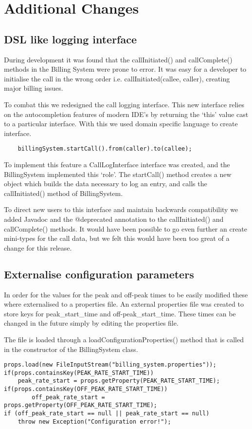 \section{Additional Changes}

\subsection{DSL like logging interface}
During development it was found that the callInitiated() and callComplete() methods in the Billing System were prone to error. It was easy for a developer to initialise the call in the wrong order i.e. callInitiated(callee, caller), creating major billing issues.

To combat this we redesigned the call logging interface. This new interface relies on the autocompletion features of modern IDE’s by returning the ‘this’ value cast to a particular interface. With this we used domain specific language to create interface.
\begin{lstlisting}
	billingSystem.startCall().from(caller).to(callee);
\end{lstlisting}
To implement this feature a CallLogInterface interface was created, and the BillingSystem implemented this ‘role’. The startCall() method creates a new object which builds the data necessary to log an entry, and calls the callInitiated() method of BillingSystem.

To direct new users to this interface and maintain backwards compatibility we added Javadoc and the @deprecated annotation to the callInitiated()  and callComplete() methods. It would have been possible to go even further an create mini-types for the call data, but we felt this would have been too great of a change for this release.

\subsection{Externalise configuration parameters}
In order for the values for the peak and off-peak times to be easily modified these where externalised to a properties file. An external properties file was created to store keys for peak\_start\_time and off-peak\_start\_time. These times can be changed in the future simply by editing the properties file.

The file is loaded through a loadConfigurationProperties() method that is called in the constructor of the BillingSystem class. 

\begin{lstlisting}
props.load(new FileInputStream("billing_system.properties"));
if(props.containsKey(PEAK_RATE_START_TIME))
	peak_rate_start = props.getProperty(PEAK_RATE_START_TIME);	if(props.containsKey(OFF_PEAK_RATE_START_TIME))
     	off_peak_rate_start = props.getProperty(OFF_PEAK_RATE_START_TIME);
if (off_peak_rate_start == null || peak_rate_start == null)
	throw new Exception("Configuration error!");	
\end{lstlisting}

